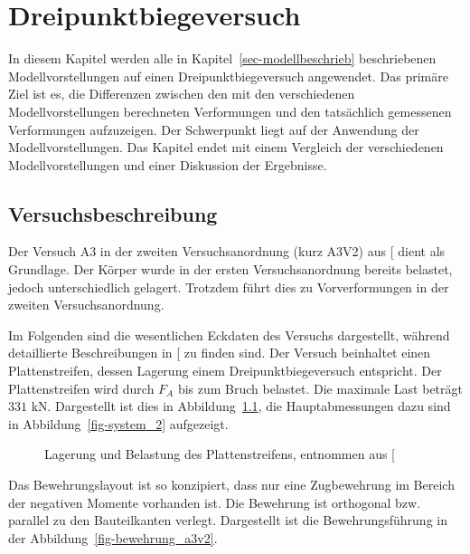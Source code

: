 \documentclass[
  12pt,
  letterpaper,
  egregdoesnotlikesansseriftitles]{scrreprt}
\begin{document}

\chapter{Dreipunktbiegeversuch}\label{sec-dreipunkt}

In diesem Kapitel werden alle in Kapitel~\ref{sec-modellbeschrieb}
beschriebenen Modellvorstellungen auf einen Dreipunktbiegeversuch
angewendet. Das primäre Ziel ist es, die Differenzen zwischen den mit
den verschiedenen Modellvorstellungen berechneten Verformungen und den
tatsächlich gemessenen Verformungen aufzuzeigen. Der Schwerpunkt liegt
auf der Anwendung der Modellvorstellungen. Das Kapitel endet mit einem
Vergleich der verschiedenen Modellvorstellungen und einer Diskussion der
Ergebnisse.

\section{Versuchsbeschreibung}\label{versuchsbeschreibung}

Der Versuch A3 in der zweiten Versuchsanordnung (kurz A3V2) aus
{[}\citeproc{ref-Jaeger2006}{1}{]} dient als Grundlage. Der Körper wurde
in der ersten Versuchsanordnung bereits belastet, jedoch unterschiedlich
gelagert. Trotzdem führt dies zu Vorverformungen in der zweiten
Versuchsanordnung.

Im Folgenden sind die wesentlichen Eckdaten des Versuchs dargestellt,
während detaillierte Beschreibungen in
{[}\citeproc{ref-Jaeger2006}{1}{]} zu finden sind. Der Versuch
beinhaltet einen Plattenstreifen, dessen Lagerung einem
Dreipunktbiegeversuch entspricht. Der Plattenstreifen wird durch \(F_A\)
bis zum Bruch belastet. Die maximale Last beträgt \(331 \text{ kN}\).
Dargestellt ist dies in Abbildung~\ref{fig-lagerung_a3v2}, die
Hauptabmessungen dazu sind in Abbildung~\ref{fig-system_2} aufgezeigt.

\begin{figure}[H]


\caption{\label{fig-lagerung_a3v2}Lagerung und Belastung des
Plattenstreifens, entnommen aus {[}\citeproc{ref-Jaeger2006}{1}{]}}

\end{figure}%

Das Bewehrungslayout ist so konzipiert, dass nur eine Zugbewehrung im
Bereich der negativen Momente vorhanden ist. Die Bewehrung ist
orthogonal bzw. parallel zu den Bauteilkanten verlegt. Dargestellt ist
die Bewehrungsführung in der Abbildung~\ref{fig-bewehrung_a3v2}.
\end{document}
